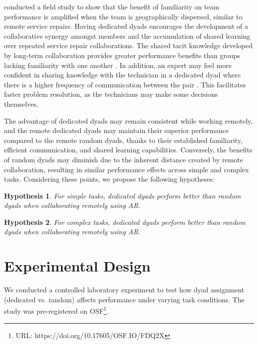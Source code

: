 \documentclass[msom,nonblindrev]{01 latex/class/informs3}
\newtheorem{hypothesis}{Hypothesis}
\begin{document}
\citet{espinosa2007familiarity} conducted a field study to show that the benefit of familiarity on team performance is amplified when the team is geographically dispersed, similar to remote service repairs. Having dedicated dyads encourages the development of a collaborative synergy amongst members and the accumulation of shared learning over repeated service repair collaborations. The shared tacit knowledge developed by long-term collaboration provides greater performance benefits than groups lacking familiarity with one another \citep{berman2002tacit}. In addition, an expert may feel more confident in sharing knowledge with the technician in a dedicated dyad where there is a higher frequency of communication between the pair \citep{siemsen2009influence}. This facilitates faster problem resolution, as the technicians may make some decisions themselves. 


The advantage of dedicated dyads may remain consistent while working remotely, and the remote dedicated dyads may maintain their superior performance compared to the remote random dyads, thanks to their established familiarity, efficient communication, and shared learning capabilities. Conversely, the benefits of random dyads may diminish due to the inherent distance created by remote collaboration, resulting in similar performance effects across simple and complex tasks. Considering these points, we propose the following hypotheses:
\begin{hypothesis}\label{h:remote_simple}
For simple tasks, dedicated dyads perform better than random dyads when collaborating remotely using AR.
\end{hypothesis}

\begin{hypothesis}\label{h:remote_complex}
For complex tasks, dedicated dyads perform better than random dyads when collaborating remotely using AR.
\end{hypothesis}




\section{Experimental Design}
We conducted a controlled laboratory experiment to test how dyad assignment (dedicated vs. random) affects performance under varying task conditions. The study was pre-registered on OSF\footnote{URL: https://doi.org/10.17605/OSF.IO/FDQ2X}.
\end{document}

